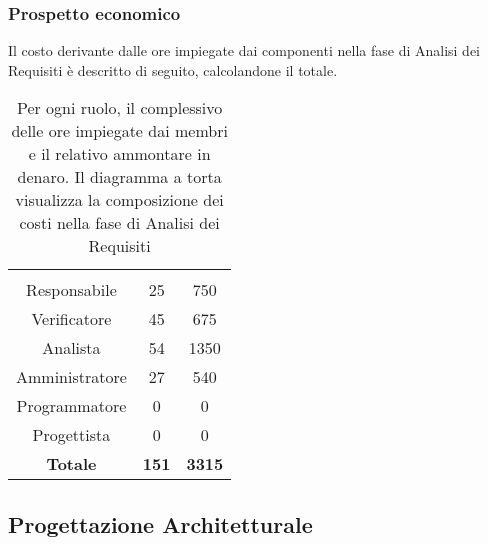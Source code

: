 \subsubsection{Prospetto economico}
Il costo derivante dalle ore impiegate dai componenti nella fase di Analisi dei Requisiti è descritto di seguito, calcolandone il totale.

\begin{table}[H]
	{\setlength{\parindent}{0cm}
		\begin{minipage}{.43\textwidth}
			\begin{tabular}{ccc}
				\rowcolorhead
				\headertitle{Ruolo} & \headertitle{Ore} & \headertitle{Costo(\euro{})}\\
				Responsabile & 25 & 750\\
				Verificatore & 45 & 675\\
				Analista & 54 & 1350\\
				Amministratore & 27 & 540\\
				Programmatore & 0 & 0\\
				Progettista & 0 & 0\\
				\hline
				\textbf{Totale} & \textbf{151} & \textbf{3315}\\
			\end{tabular}
		\end{minipage}%
		\begin{minipage}{.57\textwidth}
	\end{minipage} }
	\caption[Prospetto economico della fase di Analisi dei Requisiti]{Per ogni ruolo, il complessivo delle ore impiegate dai membri e il relativo ammontare in denaro. Il diagramma a torta visualizza la composizione dei costi nella fase di Analisi dei Requisiti}
\end{table}




\subsection{Progettazione Architetturale}

